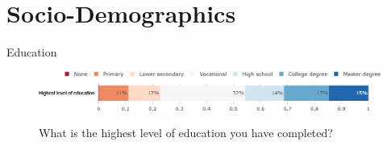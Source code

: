 \documentclass[aspectratio=169,9pt,dvipsnames]{beamer}
\begin{document}
%
%
%
%
%

\section{Socio-Demographics}
\begin{frame}{Education}%
    \hspace{.2cm}
\begin{figure}[h!]
\centering
\caption{What is the highest level of education you have completed?}
\includegraphics[width=.9\textwidth]{../figures/DK/education_DK.png} \\
\vspace{.3cm}
\end{figure}
\end{frame}
\end{document}
